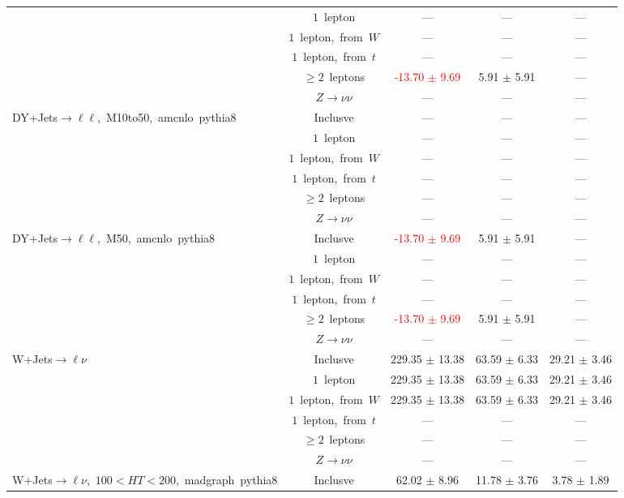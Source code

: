 \documentclass{article}
\begin{document}
\begin{longtable}{|l|c|c|c|c|}
 & $1$~lepton  & ---  & ---  & --- \\* 
 & $1$~lepton,~from~$W$  & ---  & ---  & --- \\* 
 & $1$~lepton,~from~$t$  & ---  & ---  & --- \\* 
 & $\ge2$~leptons  & \textcolor{red}{ -13.70 $\pm$ 9.69 }  & 5.91 $\pm$ 5.91  & --- \\* 
 & $Z\rightarrow\nu\nu$  & ---  & ---  & --- \\* 
\hline 
\multirow{6}{*}{DY+Jets$\rightarrow\ell\ell$,~M10to50,~amcnlo~pythia8} & Inclusve  & ---  & ---  & --- \\* 
 & $1$~lepton  & ---  & ---  & --- \\* 
 & $1$~lepton,~from~$W$  & ---  & ---  & --- \\* 
 & $1$~lepton,~from~$t$  & ---  & ---  & --- \\* 
 & $\ge2$~leptons  & ---  & ---  & --- \\* 
 & $Z\rightarrow\nu\nu$  & ---  & ---  & --- \\* 
\hline 
\multirow{6}{*}{DY+Jets$\rightarrow\ell\ell$,~M50,~amcnlo~pythia8} & Inclusve  & \textcolor{red}{ -13.70 $\pm$ 9.69 }  & 5.91 $\pm$ 5.91  & --- \\* 
 & $1$~lepton  & ---  & ---  & --- \\* 
 & $1$~lepton,~from~$W$  & ---  & ---  & --- \\* 
 & $1$~lepton,~from~$t$  & ---  & ---  & --- \\* 
 & $\ge2$~leptons  & \textcolor{red}{ -13.70 $\pm$ 9.69 }  & 5.91 $\pm$ 5.91  & --- \\* 
 & $Z\rightarrow\nu\nu$  & ---  & ---  & --- \\* 
\hline 
\multirow{6}{*}{W+Jets$\rightarrow\ell\nu$} & Inclusve  & 229.35 $\pm$ 13.38  & 63.59 $\pm$ 6.33  & 29.21 $\pm$ 3.46 \\* 
 & $1$~lepton  & 229.35 $\pm$ 13.38  & 63.59 $\pm$ 6.33  & 29.21 $\pm$ 3.46 \\* 
 & $1$~lepton,~from~$W$  & 229.35 $\pm$ 13.38  & 63.59 $\pm$ 6.33  & 29.21 $\pm$ 3.46 \\* 
 & $1$~lepton,~from~$t$  & ---  & ---  & --- \\* 
 & $\ge2$~leptons  & ---  & ---  & --- \\* 
 & $Z\rightarrow\nu\nu$  & ---  & ---  & --- \\* 
\hline 
\multirow{6}{*}{W+Jets$\rightarrow\ell\nu$,~$100<HT<200$,~madgraph~pythia8} & Inclusve  & 62.02 $\pm$ 8.96  & 11.78 $\pm$ 3.76  & 3.78 $\pm$ 1.89 \\* 

\end{longtable}
\end{document}
